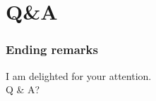 \documentclass{beamer} %
\theoremstyle{definition}
\begin{document}
	
	
	
	\section{Q\&A}
	\begin{frame}[fragile]
		\frametitle{Ending remarks}
		\begin{center}
			I am delighted for your attention.\\
			\vspace{1em}
			Q \& A?
		\end{center}
	\end{frame}
	
	
\end{document}
